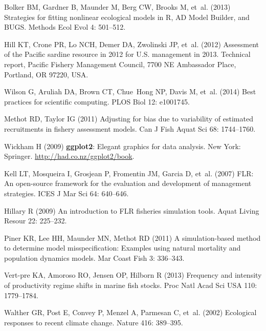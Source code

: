 \documentclass[10pt]{article}
\begin{document}
\begin{thebibliography}{10}
Bolker BM, Gardner B, Maunder M, Berg CW, Brooks M, et~al. (2013) Strategies
  for fitting nonlinear ecological models in {R}, {AD Model Builder}, and
  {BUGS}.
\newblock Methods Ecol Evol 4: 501--512.

Hill KT, Crone PR, Lo NCH, Demer DA, Zwolinski JP, et~al. (2012) Assessment of
  the {Pacific} sardine resource in 2012 for {U.S.} management in 2013.
\newblock Technical report, Pacific Fishery Management Council, 7700 NE
  Ambassador Place, Portland, OR 97220, USA.

Wilson G, Aruliah DA, Brown CT, Chue~Hong NP, Davis M, et~al. (2014) Best
  practices for scientific computing.
\newblock PLOS Biol 12: e1001745.

Methot RD, Taylor IG (2011) Adjusting for bias due to variability of estimated
  recruitments in fishery assessment models.
\newblock Can J Fish Aquat Sci 68: 1744--1760.

Wickham H (2009) \textbf{ggplot2}: Elegant graphics for data analysis.
\newblock New York: Springer.
\newblock \urlprefix\url{http://had.co.nz/ggplot2/book}.

Kell LT, Mosqueira I, Grosjean P, Fromentin JM, Garcia D, et~al. (2007) {FLR}:
  An open-source framework for the evaluation and development of management
  strategies.
\newblock ICES J Mar Sci 64: 640--646.

Hillary R (2009) An introduction to {FLR} fisheries simulation tools.
\newblock Aquat Living Resour 22: 225--232.

Piner KR, Lee HH, Maunder MN, Methot RD (2011) A simulation-based method to
  determine model misspecification: Examples using natural mortality and
  population dynamics models.
\newblock Mar Coast Fish 3: 336--343.

Vert-pre KA, Amoroso RO, Jensen OP, Hilborn R (2013) Frequency and intensity of
  productivity regime shifts in marine fish stocks.
\newblock Proc Natl Acad Sci USA 110: 1779--1784.

Walther GR, Post E, Convey P, Menzel A, Parmesan C, et~al. (2002) Ecological
  responses to recent climate change.
\newblock Nature 416: 389--395.


\end{thebibliography}
\end{document}
